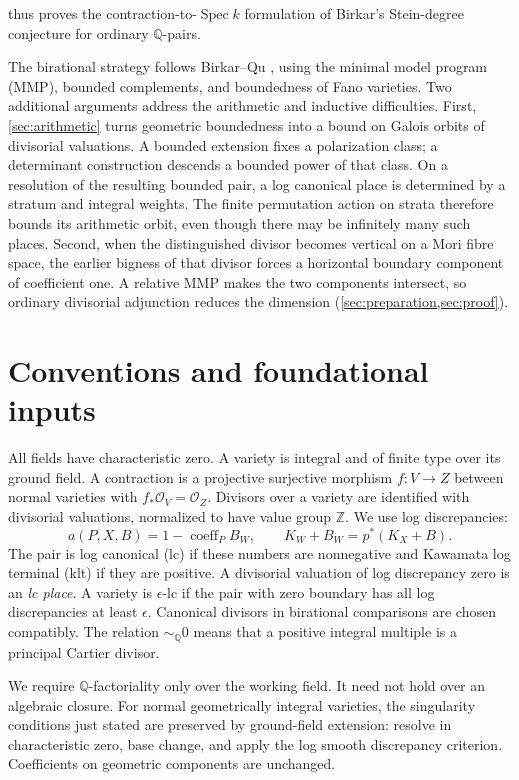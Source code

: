 \documentclass[11pt]{article}
\numberwithin{equation}{section}
\theoremstyle{definition}
\newcommand{\Q}{\mathbb Q}
\newcommand{\Z}{\mathbb Z}
\newcommand{\OO}{\mathcal O}
\newcommand{\Spec}{\operatorname{Spec}}
\newcommand{\coeff}{\operatorname{coeff}}
\newcommand{\simq}{\sim_{\Q}}
\begin{document}
 thus proves the contraction-to-$\Spec k$ formulation of
Birkar's Stein-degree conjecture for ordinary $\Q$-pairs.

The birational strategy follows Birkar--Qu \cite{BirkarQu2025}, using the
minimal model program (MMP), bounded complements, and boundedness of
Fano varieties. Two additional arguments address the arithmetic and
inductive difficulties. First, \cref{sec:arithmetic} turns geometric
boundedness into a bound on Galois orbits of divisorial valuations. A bounded
extension fixes a polarization class; a determinant construction descends
a bounded power of that class. On a resolution of the resulting bounded
pair, a log canonical place is determined by a stratum and integral
weights. The finite permutation action on strata therefore bounds its
arithmetic orbit, even though there may be infinitely many such places.
Second, when the distinguished divisor becomes vertical on a Mori fibre
space, the earlier bigness of that divisor forces a horizontal boundary
component of coefficient one. A relative MMP makes the two components
intersect, so ordinary divisorial adjunction reduces the dimension
(\cref{sec:preparation,sec:proof}).

\section{Conventions and foundational inputs}

All fields have characteristic zero. A variety is integral and of finite
type over its ground field. A contraction is a projective surjective
morphism $f:V\to Z$ between normal varieties with $f_*\OO_V=\OO_Z$.
Divisors over a variety are identified with divisorial valuations,
normalized to have value group $\Z$. We use log discrepancies:
\[
 a(P,X,B)=1-\coeff_P B_W,
 \qquad K_W+B_W=p^*(K_X+B).
\]
The pair is log canonical (lc) if these numbers are nonnegative and
Kawamata log terminal (klt) if they are positive. A divisorial valuation
of log discrepancy zero is an \emph{lc place}. A variety is
$\epsilon$-lc if the pair with zero boundary has all log discrepancies
at least $\epsilon$. Canonical divisors in birational comparisons are
chosen compatibly. The relation $\simq0$ means that a positive integral
multiple is a principal Cartier divisor.

We require $\Q$-factoriality only over the working field. It need not hold
over an algebraic closure. For normal geometrically integral varieties,
the singularity conditions just stated are preserved by ground-field
extension: resolve in characteristic zero, base change, and apply the
log smooth discrepancy criterion. Coefficients on geometric components
are unchanged.
\end{document}
